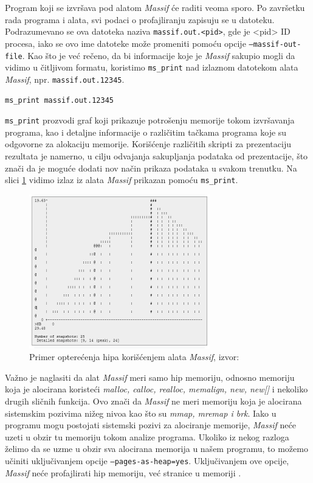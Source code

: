 \documentclass[12pt,oneside]{memoir}
\theoremstyle{plain}
\theoremstyle{definition}
\begin{document}
Program koji se izvršava pod alatom \textit{Massif} će raditi veoma sporo. Po završetku rada programa i alata, svi podaci o profajliranju zapisuju se u datoteku. Podrazumevano se ova datoteka naziva \texttt{massif.out.<pid>}, gde je <pid> ID procesa, iako se ovo ime datoteke može promeniti pomoću opcije \texttt{--massif-out-file}. Kao što je već rečeno, da bi informacije koje je \textit{Massif} sakupio mogli da vidimo u čitljivom formatu, koristimo \texttt{ms\_print} nad izlaznom datotekom alata \textit{Massif}, npr. \texttt{massif.out.12345}.

\begin{center}
\texttt{ms\_print massif.out.12345}
\end{center}

\texttt{ms\_print} prozvodi graf koji prikazuje potrošenju memorije tokom izvršavanja programa, kao i detaljne informacije o različitim tačkama programa koje su odgovorne za alokaciju memorije. Korišćenje različitih skripti za prezentaciju rezultata je namerno, u cilju odvajanja sakupljanja podataka od prezentacije, što znači da je moguće dodati nov način prikaza podataka u svakom trenutku. Na slici \ref{fig:slika2.23} vidimo izlaz iz alata \textit{Massif} prikazan pomoću \texttt{ms\_print}.
\begin{figure}[!ht]
  \centering
  \includegraphics[width=0.7\textwidth]{MassifPhoto.png}
  \caption{Primer opterećenja hipa korišćenjem alata \textit{Massif}, izvor: \cite{Massif}}
  \label{fig:slika2.23}
\end{figure}

Važno je naglasiti da alat \textit{Massif} meri samo hip memoriju, odnosno memoriju koja je alocirana koristeći \textit{malloc, calloc, realloc, memalign, new, new[]} i nekoliko drugih sličnih funkcija. Ovo znači da \textit{Massif} ne meri memoriju koja je alocirana sistemskim pozivima nižeg nivoa kao što su \textit{mmap, mremap i brk}. Iako  u programu mogu postojati sistemski pozivi za alociranje memorije, \textit{Massif} neće uzeti u obzir tu memoriju tokom analize programa. Ukoliko iz nekog razloga želimo da se uzme u  obzir sva alocirana memorija u našem programu, to možemo učiniti uključivanjem opcije \texttt{--pages-as-heap=yes}. Uključivanjem ove opcije, \textit{Massif} neće profajlirati hip memoriju, već stranice u memoriji \cite{Massif}. 
\end{document}
